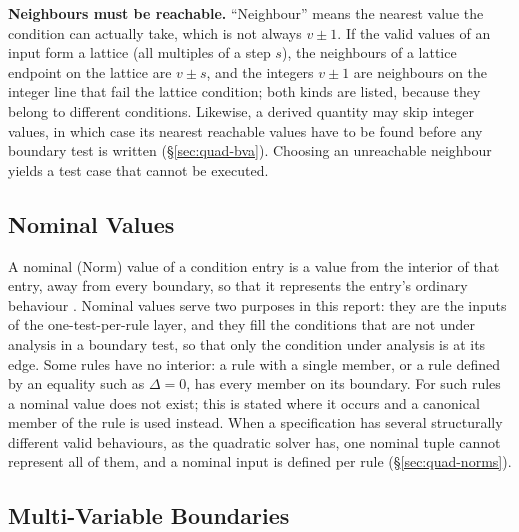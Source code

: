 \documentclass[11pt,a4paper]{article}
\newcommand{\Norm}{\mathrm{Norm}}
\begin{document}
\textbf{Neighbours must be reachable.} ``Neighbour'' means the nearest value
the condition can actually take, which is not always \(v\pm1\). If the valid
values of an input form a lattice (all multiples of a step \(s\)), the
neighbours of a lattice endpoint on the lattice are \(v\pm s\), and the
integers \(v\pm1\) are neighbours on the integer line that fail the lattice
condition; both kinds are listed, because they belong to different
conditions. Likewise, a derived quantity may skip integer values, in which
case its nearest reachable values have to be found before any boundary test
is written (\S\ref{sec:quad-bva}). Choosing an unreachable neighbour yields a
test case that cannot be executed.
\subsection{Nominal Values}
\label{sec:bg-norm}

A nominal (\(\Norm\)) value of a condition entry is a value from the
interior of that entry, away from every boundary, so that it represents the
entry's ordinary behaviour \cite[Ch.~5]{jorgensen2021}. Nominal values serve
two purposes in this report: they are the inputs of the one-test-per-rule
layer, and they fill the conditions that are not under analysis in a
boundary test, so that only the condition under analysis is at its edge.
Some rules have no interior: a rule with a single member, or a
rule defined by an equality such as \(\Delta=0\), has every member on its
boundary. For such rules a nominal value does not exist; this is stated
where it occurs and a canonical member of the rule is used instead. When a
specification has several structurally different valid behaviours, as the
quadratic solver has, one nominal tuple cannot represent all of them, and a
nominal input is defined per rule (\S\ref{sec:quad-norms}).

\subsection{Multi-Variable Boundaries}
\label{sec:bg-multi}
\end{document}

